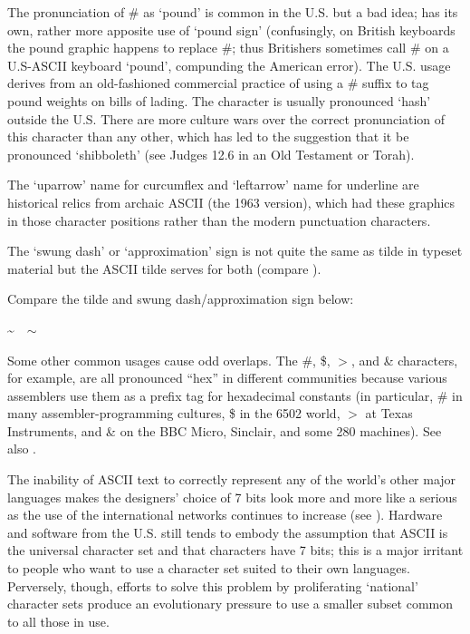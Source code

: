 The pronunciation of \# as `pound' is common in the U.S. but a bad idea;
 has its own, rather more apposite use of
`pound sign' (confusingly, on British keyboards the pound graphic happens to
replace \#; thus Britishers sometimes call \# on a U.S-ASCII keyboard `pound',
compunding the American error). The U.S. usage derives from an old-fashioned
commercial practice of using a \# suffix to tag pound weights on bills of
lading. The character is usually pronounced `hash' outside the U.S. There are
more culture wars over the correct pronunciation of this character than any
other, which has led to the  suggestion that it
be pronounced `shibboleth' (see Judges 12.6 in an Old Testament or Torah).

The `uparrow' name for curcumflex and `leftarrow' name for underline are
historical relics from archaic ASCII (the 1963 version), which had these
graphics in those character positions rather than the modern punctuation
characters.

The `swung dash' or `approximation' sign is not quite the same as tilde in
typeset material but the ASCII tilde serves for both (compare ).

\begin{new}
	Compare the tilde and swung dash/approximation sign below:
	\begin{center}
		\Huge
		\textasciitilde\ \ $\sim$
	\end{center}
\end{new}

Some other common usages cause odd overlaps. The \#, \$, $>$, and \&
characters, for example, are all pronounced ``hex'' in different communities
because various assemblers use them as a prefix tag for hexadecimal constants
(in particular, \# in many assembler-programming cultures, \$ in the 6502
world, $>$ at Texas Instruments, and \& on the BBC Micro, Sinclair, and some
280 machines). See also .

The inability of ASCII text to correctly represent any of the world's other
major languages makes the designers' choice of 7 bits look more and more like a
serious  as the use of the international networks
continues to increase (see ). Hardware and software
from the U.S. still tends to embody the assumption that ASCII is the universal
character set and that characters have 7 bits; this is a major irritant to
people who want to use a character set suited to their own languages.
Perversely, though, efforts to solve this problem by proliferating `national'
character sets produce an evolutionary pressure to use a smaller subset common
to all those in use.

